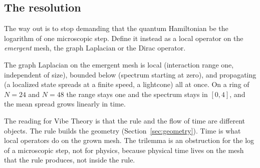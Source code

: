 \subsection{The resolution}

The way out is to stop demanding that the quantum Hamiltonian be the logarithm of one microscopic step. Define it instead as a local operator on the \emph{emergent} mesh, the graph Laplacian or the Dirac operator.

\begin{result}
The graph Laplacian on the emergent mesh is local (interaction range one, independent of size), bounded below (spectrum starting at zero), and propagating (a localized state spreads at a finite speed, a lightcone) all at once. On a ring of $N = 24$ and $N = 48$ the range stays one and the spectrum stays in $[0, 4]$, and the mean spread grows linearly in time.
\end{result}

The reading for Vibe Theory is that the rule and the flow of time are different objects. The rule builds the geometry (Section~\ref{sec:geometry}). Time is what local operators do on the grown mesh. The trilemma is an obstruction for the log of a microscopic step, not for physics, because physical time lives on the mesh that the rule produces, not inside the rule.
